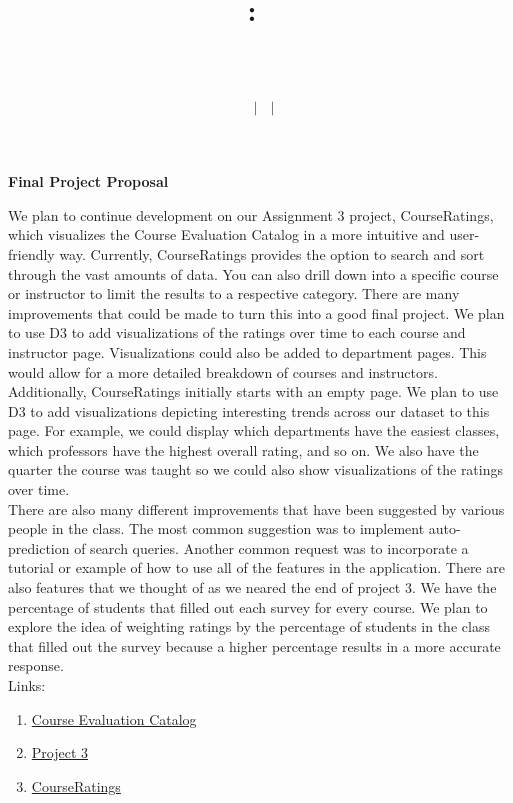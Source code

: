 \documentclass{article}
\title{
    \vspace{2in}
    \textmd{\textbf{\hmwkClass:\ \hmwkTitle}}\\
    \vspace{0.2in}\large{\textit{\hmwkClassInstructor\ \hmwkClassTime}}\\
    \author{\textbf{\hmwkAuthorName\ $\vert$ \hmwkAuthorCSE\ $\vert$ \hmwkAuthorId}}
}
\date{}
\begin{document}
\begin{center}
\LARGE
\textbf{Final Project Proposal}
\end{center}

We plan to continue development on our Assignment 3 project, CourseRatings, which visualizes the Course Evaluation Catalog in a more intuitive and user-friendly way. Currently, CourseRatings provides the option to search and sort through the vast amounts of data. You can also drill down into a specific course or instructor to limit the results to a respective category. There are many improvements that could be made to turn this into a good final project. We plan to use D3 to add visualizations of the ratings over time to each course and instructor page. Visualizations could also be added to department pages. This would allow for a more detailed breakdown of courses and instructors.  Additionally, CourseRatings initially starts with an empty page. We plan to use D3 to add visualizations depicting interesting trends across our dataset to this page. For example, we could display which departments have the easiest classes, which professors have the highest overall rating, and so on. We also have the quarter the course was taught so we could also show visualizations of the ratings over time.\\

There are also many different improvements that have been suggested by various people in the class. The most common suggestion was to implement auto-prediction of search queries. Another common request was to incorporate a tutorial or example of how to use all of the features in the application. There are also features that we thought of as we neared the end of project 3. We have the percentage of students that filled out each survey for every course. We plan to explore the idea of weighting ratings by the percentage of students in the class that filled out the survey because a higher percentage results in a more accurate response.\\

Links:
\begin{enumerate}
    \item {\color{blue} \href{https://www.washington.edu/cec/toc.html}{Course Evaluation Catalog}}
    \item {\color{blue} \href{https://github.com/CSE512-15S/a3-emilygu-drapeau-vjampala}{Project 3}}
    \item {\color{blue} \href{https://students.washington.edu/drapeau/course_ratings/}{CourseRatings}}
\end{enumerate}
\end{document}
